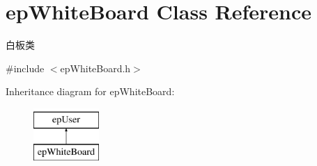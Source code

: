\hypertarget{classepWhiteBoard}{\section{ep\-White\-Board \-Class \-Reference}
\label{classepWhiteBoard}
}


白板类  




{\ttfamily \#include $<$ep\-White\-Board.\-h$>$}

\-Inheritance diagram for ep\-White\-Board\-:\begin{figure}[H]
\begin{center}
\leavevmode
\includegraphics[height=2.000000cm]{classepWhiteBoard}
\end{center}
\end{figure}
